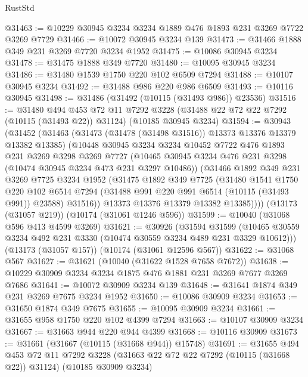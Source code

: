 \begin{lexlean}{RustStd}
\begin{coremodule}
@31463 := @10229 @30945 @3234 @3234 @1889 @476 @1893 @231 @3269 @7722 @3269 @7729
@31466 := @10072 @30945 @3234 @139
@31473 := @31466 @1888 @349 @231 @3269 @7720 @3234 @1952
@31475 := @10086 @30945 @3234
@31478 := @31475 @1888 @349 @7720
@31480 := @10095 @30945 @3234
@31486 := @31480 @1539 @1750 @220 @102 @6509 @7294
@31488 := @10107 @30945 @3234
@31492 := @31488 @986 @220 @986 @6509
@31493 := @10116 @30945
@31498 := @31486 (@31492 (@10115 (@31493 @986)) @23536)
@31516 := @31480
    @494
    @453
    @72
    @11
    @7292
    @3228
    (@31488 @22 @72 @22 @7292 (@10115 (@31493 @22)) @31124)
    (@10185 @30945 @3234)
@31594 := @30943
    (@31452
      (@31463
        (@31473 (@31478 (@31498 @31516)) @13373 @13376 @13379 @13382 @13385)
        (@10448
          @30945
          @3234
          @3234
          @10452
          @7722
          @476
          @1893
          @231
          @3269
          @3298
          @3269
          @7727
          (@10465 @30945 @3234 @476 @231 @3298 (@10474 @30945 @3234 @473 @231 @3297 @10486))
          (@31466
            @1892
            @349
            @231
            @3269
            @7725
            @3234
            @1952
            (@31475
              @1892
              @349
              @7725
              (@31480
                @1541
                @1750
                @220
                @102
                @6514
                @7294
                (@31488 @991 @220 @991 @6514 (@10115 (@31493 @991)) @23588)
                @31516))
            @13373
            @13376
            @13379
            @13382
            @13385))))
    (@13173 (@31057 @219))
    (@10174 (@31061 @1246 @596))
@31599 := @10040 (@31068 @596 @413 @4599 @3269)
@31621 := @30926
    (@31594
      @31599
      (@10465 @30559 @3234 @492 @231 @3330 (@10474 @30559 @3234 @489 @231 @3329 @10612)))
    (@13173 (@31057 @157))
    (@10174 (@31061 @12596 @567))
@31622 := @31068 @567
@31627 := @31621 (@10040 (@31622 @1528 @7658 @7672))
@31638 := @10229 @30909 @3234 @3234 @1875 @476 @1881 @231 @3269 @7677 @3269 @7686
@31641 := @10072 @30909 @3234 @139
@31648 := @31641 @1874 @349 @231 @3269 @7675 @3234 @1952
@31650 := @10086 @30909 @3234
@31653 := @31650 @1874 @349 @7675
@31655 := @10095 @30909 @3234
@31661 := @31655 @958 @1750 @220 @102 @4399 @7294
@31663 := @10107 @30909 @3234
@31667 := @31663 @944 @220 @944 @4399
@31668 := @10116 @30909
@31673 := @31661 (@31667 (@10115 (@31668 @944)) @15748)
@31691 := @31655
    @494
    @453
    @72
    @11
    @7292
    @3228
    (@31663 @22 @72 @22 @7292 (@10115 (@31668 @22)) @31124)
    (@10185 @30909 @3234)

\end{coremodule}
\end{lexlean}
